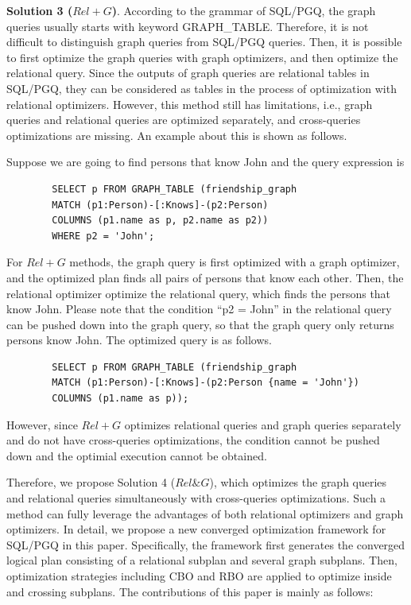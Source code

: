 \textbf{Solution 3 ($Rel+G$)}.
According to the grammar of SQL/PGQ, the graph queries usually starts with keyword GRAPH\_TABLE.
Therefore, it is not difficult to distinguish graph queries from SQL/PGQ queries.
Then, it is possible to first optimize the graph queries with graph optimizers, and then optimize the relational query.
Since the outputs of graph queries are relational tables in SQL/PGQ, they can be considered as tables in the process of optimization with relational optimizers.
However, this method still has limitations, i.e., graph queries and relational queries are optimized separately, and cross-queries optimizations are missing.
An example about this is shown as follows.

\begin{example}
    Suppose we are going to find persons that know John and the query expression is
    \begin{lstlisting}
        SELECT p FROM GRAPH_TABLE (friendship_graph 
        MATCH (p1:Person)-[:Knows]-(p2:Person)
        COLUMNS (p1.name as p, p2.name as p2))
        WHERE p2 = 'John';
    \end{lstlisting}
    For $Rel+G$ methods, the graph query is first optimized with a graph optimizer, and the optimized plan finds all pairs of persons that know each other.
    Then, the relational optimizer optimize the relational query, which finds the persons that know John.
    Please note that the condition ``p2 = John'' in the relational query can be pushed down into the graph query, so that the graph query only returns persons know John.
    The optimized query is as follows.
    \begin{lstlisting}
        SELECT p FROM GRAPH_TABLE (friendship_graph 
        MATCH (p1:Person)-[:Knows]-(p2:Person {name = 'John'})
        COLUMNS (p1.name as p));
    \end{lstlisting}
    However, since $Rel+G$ optimizes relational queries and graph queries separately and do not have cross-queries optimizations, the condition cannot be pushed down and the optimial execution cannot be obtained.
\end{example}

Therefore, we propose Solution 4 ($Rel\&G$), which optimizes the graph queries and relational queries simultaneously with cross-queries optimizations.
Such a method can fully leverage the advantages of both relational optimizers and graph optimizers.
In detail, we propose a new converged optimization framework for SQL/PGQ in this paper.
Specifically, the framework first generates the converged logical plan consisting of a relational subplan and several graph subplans.
Then, optimization strategies including CBO and RBO are applied to optimize inside and crossing subplans.
The contributions of this paper is mainly as follows:


